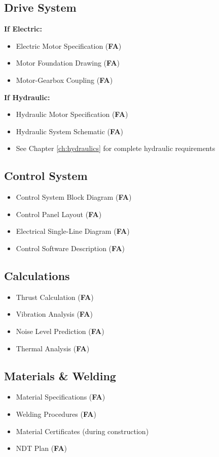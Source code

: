 \documentclass[11pt,a4paper]{report}
\newcommand{\fa}{\textbf{\textcolor{warningred}{FA}}}
\begin{document}
\subsection{Drive System}
\textbf{If Electric:}
\begin{itemize}[label=$\square$]
\item Electric Motor Specification (\fa{})
\item Motor Foundation Drawing (\fa{})
\item Motor-Gearbox Coupling (\fa{})
\end{itemize}

\textbf{If Hydraulic:}
\begin{itemize}[label=$\square$]
\item Hydraulic Motor Specification (\fa{})
\item Hydraulic System Schematic (\fa{})
\item See Chapter \ref{ch:hydraulics} for complete hydraulic requirements
\end{itemize}

\subsection{Control System}
\begin{itemize}[label=$\square$]
\item Control System Block Diagram (\fa{})
\item Control Panel Layout (\fa{})
\item Electrical Single-Line Diagram (\fa{})
\item Control Software Description (\fa{})
\end{itemize}

\subsection{Calculations}
\begin{itemize}[label=$\square$]
\item Thrust Calculation (\fa{})
\item Vibration Analysis (\fa{})
\item Noise Level Prediction (\fa{})
\item Thermal Analysis (\fa{})
\end{itemize}

\subsection{Materials \& Welding}
\begin{itemize}[label=$\square$]
\item Material Specifications (\fa{})
\item Welding Procedures (\fa{})
\item Material Certificates (during construction)
\item NDT Plan (\fa{})
\end{itemize}
\end{document}

